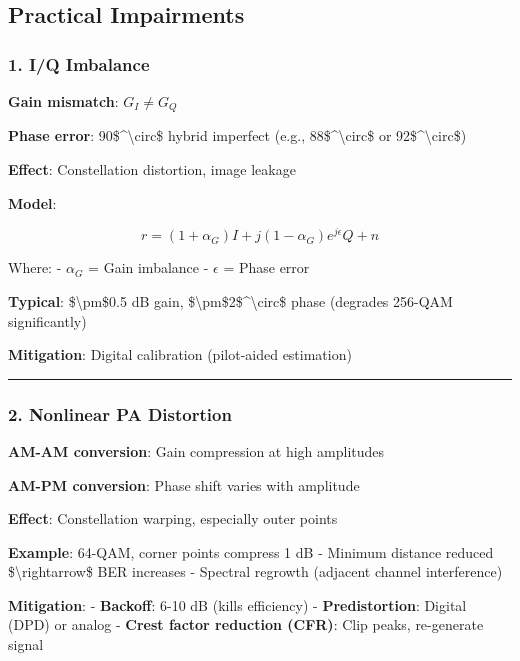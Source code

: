 \subsection{Practical Impairments}\label{practical-impairments}

\subsubsection{1. I/Q Imbalance}\label{iq-imbalance}

\textbf{Gain mismatch}: \(G_I \neq G_Q\)

\textbf{Phase error}: 90\$\^{}\textbackslash circ\$ hybrid imperfect
(e.g., 88\$\^{}\textbackslash circ\$ or 92\$\^{}\textbackslash circ\$)

\textbf{Effect}: Constellation distortion, image leakage

\textbf{Model}:

\[
r = (1 + \alpha_G) I + j(1 - \alpha_G) e^{j\epsilon} Q + n
\]

Where: - \(\alpha_G\) = Gain imbalance - \(\epsilon\) = Phase error

\textbf{Typical}: \$\textbackslash pm\$0.5 dB gain,
\$\textbackslash pm\$2\$\^{}\textbackslash circ\$ phase (degrades
256-QAM significantly)

\textbf{Mitigation}: Digital calibration (pilot-aided estimation)

\begin{center}\rule{0.5\linewidth}{0.5pt}\end{center}

\subsubsection{2. Nonlinear PA
Distortion}\label{nonlinear-pa-distortion}

\textbf{AM-AM conversion}: Gain compression at high amplitudes

\textbf{AM-PM conversion}: Phase shift varies with amplitude

\textbf{Effect}: Constellation warping, especially outer points

\textbf{Example}: 64-QAM, corner points compress 1 dB - Minimum distance
reduced \$\textbackslash rightarrow\$ BER increases - Spectral regrowth
(adjacent channel interference)

\textbf{Mitigation}: - \textbf{Backoff}: 6-10 dB (kills efficiency) -
\textbf{Predistortion}: Digital (DPD) or analog - \textbf{Crest factor
reduction (CFR)}: Clip peaks, re-generate signal

